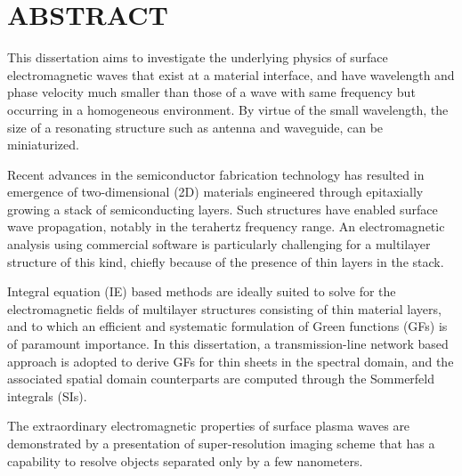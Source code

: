 %
%
%

\chapter*{ABSTRACT}

\pagestyle{plain} %
\setcounter{page}{2}

\indent This dissertation aims to investigate the underlying physics of surface electromagnetic waves that exist at a material interface, and have wavelength and phase velocity much smaller than those of a wave with same frequency but occurring in a homogeneous environment. By virtue of the small wavelength, the size of a resonating structure such as antenna and waveguide, can be miniaturized.

Recent advances in the semiconductor fabrication technology has resulted in emergence of two-dimensional (2D) materials engineered through epitaxially growing a stack of semiconducting layers. Such structures have enabled surface wave propagation, notably in the terahertz frequency range. An electromagnetic analysis using commercial software is particularly challenging for a multilayer structure of this kind, chiefly because of the presence of thin layers in the stack.

Integral equation (IE) based methods are ideally suited to solve for the electromagnetic fields of multilayer structures consisting of thin material layers, and to which an efficient and systematic formulation of Green functions (GFs) is of paramount importance. In this dissertation, a transmission-line network based approach is adopted to derive GFs for thin sheets in the spectral domain, and the associated spatial domain counterparts are computed through the Sommerfeld integrals (SIs).

The extraordinary electromagnetic properties of surface plasma waves are demonstrated by a presentation of super-resolution imaging scheme that has a capability to resolve objects separated only by a few nanometers.

\pagebreak{}

